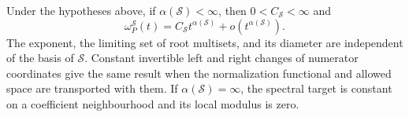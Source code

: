 \begin{theorem}
\label{thm:constrained-newton}
Under the hypotheses above, if $\alpha(\mathcal S)<\infty$, then
$0<C_{\mathcal S}<\infty$ and
\begin{equation}\label{eq:exact-constrained-modulus}
 \omega_P^{\mathcal S}(t)
            =C_{\mathcal S}t^{\alpha(\mathcal S)}
                           +o(t^{\alpha(\mathcal S)}).
\end{equation}
The exponent, the limiting set of root multisets, and its diameter
are independent of the basis of $\mathcal S$. Constant invertible
left and right changes of numerator coordinates give the same result
when the normalization functional and allowed space are transported
with them. If $\alpha(\mathcal S)=\infty$, the spectral target is
constant on a coefficient neighbourhood and its local modulus is zero.
\end{theorem}
